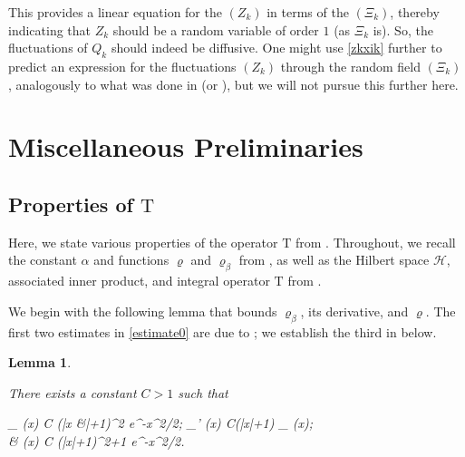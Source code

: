 \documentclass{amsart}
\numberwithin{equation}{section}
\newtheorem{lem}[thm]{Lemma}
\theoremstyle{remark}
\theoremstyle{definition}
\begin{document}
	\noindent This provides a linear equation for the $(Z_k)$ in terms of the $(\Xi_k)$, thereby indicating that $Z_k$ should be a random variable of order $1$ (as $\Xi_k$ is). So, the fluctuations of $Q_k$ should indeed be diffusive. One might use \eqref{zkxik} further to predict an expression for the fluctuations $(Z_k)$ through the random field $(\Xi_k)$, analogously to what was done in  (or \cite[Appendix B]{LC}), but we will not pursue this further here.
	
	
	
	\section{Miscellaneous Preliminaries} 
	
	\label{MatrixLattice} 
	
	
	
	\subsection{Properties of $\bm{\mathrm{T}}$} 
	
	\label{TProperty}
	
	Here, we state various properties of the operator $\bm{\mathrm{T}}$ from . Throughout, we recall the constant $\alpha$ and functions $\varrho$ and $\varrho_{\beta}$ from , as well as the Hilbert space $\mathcal{H}$, associated inner product, and integral operator $\bm{\mathrm{T}}$ from . 
	
	We begin with the following lemma that bounds $\varrho_{\beta}$, its derivative, and $\varrho$. The first two estimates in \eqref{estimate0} are due to \cite[Lemma 2.2]{RET}; we establish the third in  below. 
	
	\begin{lem}
		
		\label{rhoexponential} 
		
		There exists a constant $C > 1$ such that 
		\begin{flalign}
			\label{estimate0} 
			\begin{aligned} 
			\varrho_{\beta} (x) \le C (|x &|+1)^{2 \theta} e^{-\beta x^2/2}; \qquad \varrho_{\beta}' (x) \le C(|x|+1) \varrho_{\beta} (x); \\
			& \varrho (x) \le C (|x|+1)^{2\theta+1} e^{-\beta x^2/2}.
			\end{aligned} 
		\end{flalign} 
	\end{lem} 
	
\end{document}
